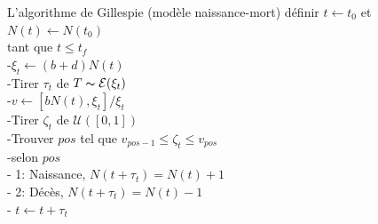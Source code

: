 \documentclass[aspectratio=169]{beamer}\usepackage[]{graphicx}\usepackage[]{xcolor}
\begin{document}
\begin{frame}{L'algorithme de Gillespie (modèle naissance-mort)}
définir $t\leftarrow t_0$ et $N(t)\leftarrow N(t_0)$\\
tant que {$t\leq t_f$}\\
-\qquad $\xi_t\leftarrow (b+d)N(t)$\\
-\qquad Tirer $\tau_t$ de $T\thicksim \mathcal{E}(\xi_t)$\\
-\qquad $v\leftarrow\left[bN(t),\xi_t\right]/\xi_t$\\
-\qquad Tirer $\zeta_t$ de $\mathcal{U}([0,1])$\\
-\qquad Trouver $pos$ tel que $v_{pos-1}\leq\zeta_t\leq v_{pos}$\\
-\qquad selon {$pos$}\\
\qquad\qquad - 1: Naissance, $N(t+\tau_t)=N(t)+1$ \\
\qquad\qquad - 2: Décès, $N(t+\tau_t)=N(t)-1$ \\
- $t\leftarrow t+\tau_t$
\end{frame}
\end{document}
